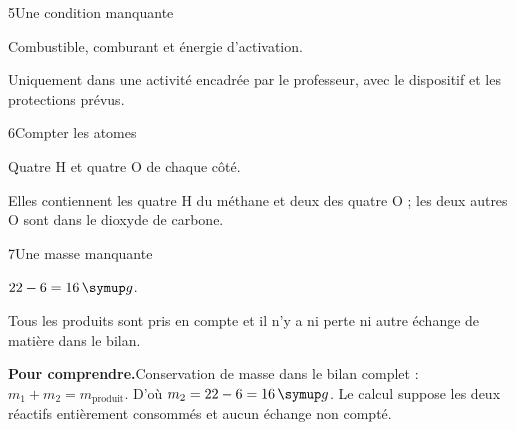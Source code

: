 \par\noindent\begin{minipage}{\linewidth}
\begin{corrige}{5}{Une condition manquante}
\begin{questions}
\item Combustible, comburant et énergie d’activation.
\item Uniquement dans une activité encadrée par le professeur, avec le dispositif et les protections prévus.
\end{questions}
\end{corrige}
\end{minipage}
\par\noindent\begin{minipage}{\linewidth}
\begin{corrige}{6}{Compter les atomes}
\begin{questions}
\item Quatre H et quatre O de chaque côté.
\item Elles contiennent les quatre H du méthane et deux des quatre O ; les deux autres O sont dans le dioxyde de carbone.
\end{questions}
\end{corrige}
\end{minipage}
\par\noindent\begin{minipage}{\linewidth}
\begin{corrige}{7}{Une masse manquante}
\begin{questions}
\item $22-6=16\unite g$.
\item Tous les produits sont pris en compte et il n’y a ni perte ni autre échange de matière dans le bilan.
\end{questions}
\par\smallskip\noindent\textbf{Pour comprendre.}\enspace Conservation de masse dans le bilan complet : $m_1+m_2=m_{\text{produit}}$. D’où $m_2=22-6=16\unite g$. Le calcul suppose les deux réactifs entièrement consommés et aucun échange non compté.\par
\end{corrige}
\end{minipage}
